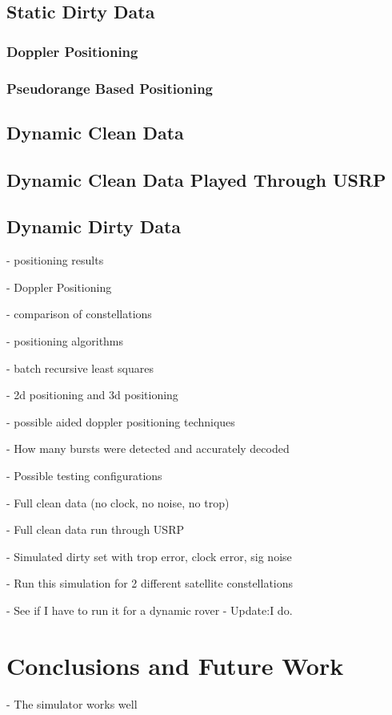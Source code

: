 \documentclass[12pt]{report}
\begin{document}
\section{Static Dirty Data}
\subsection{Doppler Positioning}
\subsection{Pseudorange Based Positioning}
\section{Dynamic Clean Data}
\section{Dynamic Clean Data Played Through USRP}
\section{Dynamic Dirty Data}
    - positioning results

    - Doppler Positioning 

    - comparison of constellations 

    - positioning algorithms

    - batch recursive least squares

    - 2d positioning and 3d positioning

    - possible aided doppler positioning techniques

    - How many bursts were detected and accurately decoded

    - Possible testing configurations   
        
        - Full clean data (no clock, no noise, no trop)

        - Full clean data run through USRP 

        - Simulated dirty set with trop error, clock error, sig noise

        - Run this simulation for 2 different satellite constellations

        - See if I have to run it for a dynamic rover 
            - Update:I do.




\chapter{Conclusions and Future Work}
- The simulator works well 
\end{document}
